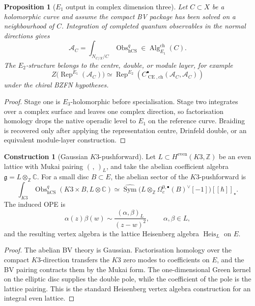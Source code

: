 \documentclass[11pt]{amsart}
\providecommand{\C}{\mathbb{C}}
\providecommand{\Z}{\mathbb{Z}}
\providecommand{\gfrak}{\mathfrak{g}}
\providecommand{\Sym}{\operatorname{Sym}}
\providecommand{\Rep}{\operatorname{Rep}}
\providecommand{\Obs}{\operatorname{Obs}}
\providecommand{\CE}{\operatorname{CE}}
\providecommand{\hCS}{\operatorname{hCS}}
\providecommand{\Eone}{E_1}
\providecommand{\Etwo}{E_2}
\providecommand{\Heis}{\operatorname{Heis}}
\theoremstyle{plain}
\newtheorem{proposition}[theorem]{Proposition}
\theoremstyle{definition}
\newtheorem{construction}[theorem]{Construction}
\theoremstyle{remark}
\begin{document}
\begin{proposition}[\(E_1\) output in complex dimension three]
\label{prop:e1-output}
Let \(C\subset X\) be a holomorphic curve and assume the compact BV
package has been solved on a neighbourhood of \(C\).  Integration of
completed quantum observables in the normal directions gives
\[
  \mathcal A_C=
  \int_{N_{C/X}/C}\Obs^q_{\hCS}
  \in
  \operatorname{Alg}^{\mathrm{ch}}_{\Eone}(C).
\]
The \(\Etwo\)-structure belongs to the centre, double, or module layer,
for example
\[
  Z\bigl(\Rep^{\Eone}(\mathcal A_C)\bigr)
  \simeq
  \Rep^{\Etwo}\!\left(
    C^\bullet_{\CE,\mathrm{ch}}(\mathcal A_C,\mathcal A_C)
  \right)
\]
under the chiral BZFN hypotheses.
\end{proposition}

\begin{proof}
Stage one is \(E_3\)-holomorphic before specialisation.  Stage two
integrates over a complex surface and leaves one complex direction, so
factorisation homology drops the native operadic level to \(E_1\) on
the reference curve.  Braiding is recovered only after applying the
representation centre, Drinfeld double, or an equivalent module-layer
construction.
\end{proof}

\begin{construction}[Gaussian \(K3\)-pushforward]
\label{cons:gaussian-k3-pushforward}
Let \(L\subset H^{\mathrm{even}}(K3,\Z)\) be an even lattice with Mukai
pairing \((\, ,\,)_L\), and take the abelian coefficient algebra
\(\gfrak=L\otimes_\Z\C\).  For a small disc \(B\subset E\), the abelian
sector of the \(K3\)-pushforward is
\[
  \int_{K3}\Obs^q_{\hCS}(K3\times B,L\otimes\C)
  \simeq
  \widehat{\Sym}
  \bigl(L\otimes_\Z\Omega^{0,\bullet}_c(B)^\vee[-1]\bigr)[[\hbar]]_\star .
\]
The induced OPE is
\[
  \alpha(z)\beta(w)
  \sim
  \frac{(\alpha,\beta)_L}{(z-w)^2},
  \qquad
  \alpha,\beta\in L,
\]
and the resulting vertex algebra is the lattice Heisenberg algebra
\(\Heis_L\) on \(E\).
\end{construction}

\begin{proof}
The abelian BV theory is Gaussian.  Factorisation homology over the
compact \(K3\)-direction transfers the \(K3\) zero modes to coefficients
on \(E\), and the BV pairing contracts them by the Mukai form.  The
one-dimensional Green kernel on the elliptic disc supplies the double
pole, while the coefficient of the pole is the lattice pairing.  This is
the standard Heisenberg vertex algebra construction for an integral even
lattice.
\end{proof}
\end{document}
